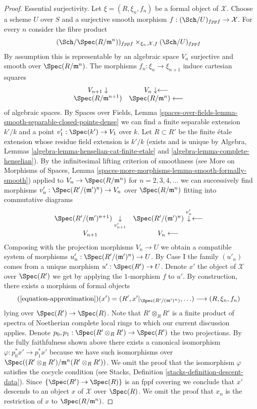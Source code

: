 \begin{proof}
\medskip\noindent
Essential surjectivity. Let $\xi = (R, \xi_n, f_n)$ be a formal object of
$\mathcal{X}$. Choose a scheme $U$ over $S$ and a surjective smooth morphism
$f : (\Sch/U)_{fppf} \to \mathcal{X}$. For every $n$ consider the fibre product
$$
(\Sch/\Spec(R/\mathfrak m^n))_{fppf}
\times_{\xi_n, \mathcal{X}, f}
(\Sch/U)_{fppf}
$$
By assumption this is representable by an algebraic space $V_n$ surjective and
smooth over $\Spec(R/\mathfrak m^n)$. The morphisms
$f_n : \xi_n \to \xi_{n + 1}$ induce cartesian squares
$$
\begin{array}{cc}V_{n + 1} \downarrow & V_n \downarrow\longleftarrow \\ \Spec(R/\mathfrak m^{n + 1}) & \Spec(R/\mathfrak m^n) \longleftarrow\end{array}
$$
of algebraic spaces. By Spaces over Fields, Lemma
\ref{spaces-over-fields-lemma-smooth-separable-closed-points-dense}
we can find a finite separable extension $k'/k$ and a point
$v'_1 : \Spec(k') \to V_1$ over $k$. Let $R \subset R'$ be the finite \'etale
extension whose residue field extension is $k'/k$ (exists and
is unique by
Algebra, Lemmas \ref{algebra-lemma-henselian-cat-finite-etale} and
\ref{algebra-lemma-complete-henselian}).
By the infinitesimal lifting criterion of smoothness (see
More on Morphisms of Spaces, Lemma
\ref{spaces-more-morphisms-lemma-smooth-formally-smooth})
applied to $V_n \to \Spec(R/\mathfrak m^n)$ for $n = 2, 3, 4, \ldots$
we can successively find morphisms
$v'_n : \Spec(R'/(\mathfrak m')^n) \to V_n$ over $\Spec(R/\mathfrak m^n)$
fitting into commutative diagrams
$$
\begin{array}{cc}\Spec(R'/(\mathfrak m')^{n + 1}) \underset{v'_{n + 1}}{\downarrow} & \Spec(R'/(\mathfrak m')^n) \overset{v'_n}{\downarrow}\longleftarrow \\ V_{n + 1} & V_n \longleftarrow\end{array}
$$
Composing with the projection morphisms $V_n \to U$ we obtain a compatible
system of morphisms $u'_n : \Spec(R'/(\mathfrak m')^n) \to U$.
By Case I the family $(u'_n)$ comes from a unique
morphism $u' : \Spec(R') \to U$. Denote $x'$ the object of $\mathcal{X}$
over $\Spec(R')$ we get by applying the $1$-morphism $f$ to $u'$.
By construction, there exists a morphism of formal objects
$$
(\ref{equation-approximation})(x') =
(R', x'|_{\Spec(R'/(\mathfrak m')^n)}, \ldots)
\longrightarrow
(R, \xi_n, f_n)
$$
lying over $\Spec(R') \to \Spec(R)$. Note that $R' \otimes_R R'$ is a finite
product of spectra of Noetherian complete local rings to which our current
discussion applies. Denote $p_0, p_1 : \Spec(R' \otimes_R R') \to \Spec(R')$
the two projections. By the fully faithfulness shown above there exists
a canonical isomorphism $\varphi : p_0^*x' \to p_1^*x'$ because we have
such isomorphisms over
$\Spec((R' \otimes_R R')/\mathfrak m^n(R' \otimes_R R'))$.
We omit the proof that the isomorphism $\varphi$ satisfies the cocycle
condition (see Stacks, Definition \ref{stacks-definition-descent-data}).
Since $\{\Spec(R') \to \Spec(R)\}$ is an fppf covering we conclude
that $x'$ descends to an object $x$ of $\mathcal{X}$ over $\Spec(R)$.
We omit the proof that $x_n$ is the restriction of $x$ to
$\Spec(R/\mathfrak m^n)$.
\end{proof}

